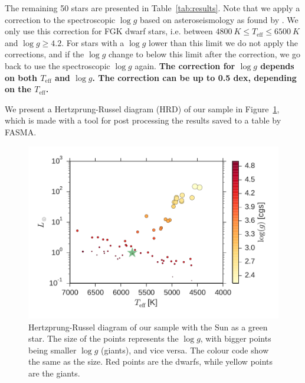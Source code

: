 \documentclass{aa}
\begin{document}
The remaining 50 stars are presented in Table~\ref{tab:results}. Note that we
apply a correction to the spectroscopic $\log g$ based on asteroseismology as
found by \citet{Mortier2014}. We only use this correction for FGK dwarf stars,
i.e. between $\SI{4800}{K}\leq T_\mathrm{eff} \leq \SI{6500}{K}$ and $\log
g\geq4.2$. For stars with a $\log g$ lower than this limit we do not apply the
corrections, and if the $\log g$ change to below this limit after the
correction, we go back to use the spectroscopic $\log g$ again. {\bf The
correction for $\log g$ depends on both $T_\mathrm{eff}$ and $\log g$. The
correction can be up to 0.5 dex, depending on the $T_\mathrm{eff}$.}

We present a Hertzprung-Russel diagram (HRD) of our sample in
Figure~\ref{fig:HRD}, which is made with a tool for post processing the results
saved to a table by FASMA.

\begin{figure}[tpb]
    \centering
    \includegraphics[width=1.0\linewidth,natwidth=440,natheight=290]{figures/HR.pdf}
    \caption{Hertzprung-Russel diagram of our sample with the Sun as a green
    star. The size of the points represents the $\log g$, with bigger points
    being smaller $\log g$ (giants), and vice versa. The colour code show the
    same as the size. Red points are the dwarfs, while yellow points are the
    giants.}
    \label{fig:HRD}
\end{figure}
\end{document}
